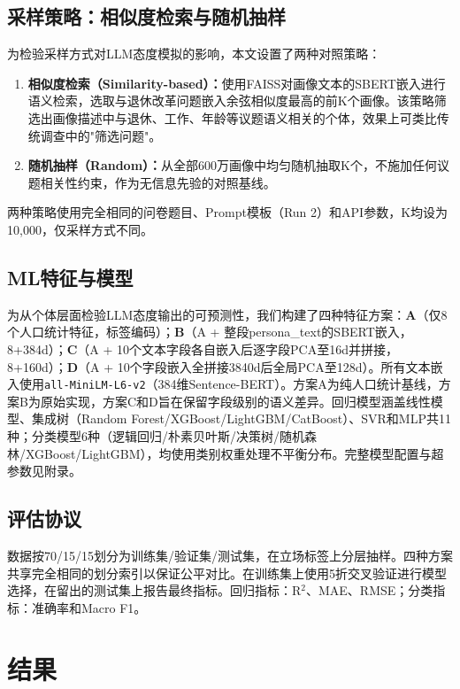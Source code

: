 \documentclass[11pt,a4paper]{ctexart}
\begin{document}
\subsection{采样策略：相似度检索与随机抽样}

为检验采样方式对LLM态度模拟的影响，本文设置了两种对照策略：

\begin{enumerate}[leftmargin=*]
    \item \textbf{相似度检索（Similarity-based）：}使用FAISS对画像文本的SBERT嵌入进行语义检索，选取与退休改革问题嵌入余弦相似度最高的前K个画像。该策略筛选出画像描述中与退休、工作、年龄等议题语义相关的个体，效果上可类比传统调查中的"筛选问题"。
    \item \textbf{随机抽样（Random）：}从全部600万画像中均匀随机抽取K个，不施加任何议题相关性约束，作为无信息先验的对照基线。
\end{enumerate}

两种策略使用完全相同的问卷题目、Prompt模板（Run 2）和API参数，K均设为10,000，仅采样方式不同。

\subsection{ML特征与模型}

为从个体层面检验LLM态度输出的可预测性，我们构建了四种特征方案：\textbf{A}（仅8个人口统计特征，标签编码）；\textbf{B}（A + 整段persona\_text的SBERT嵌入，8+384d）；\textbf{C}（A + 10个文本字段各自嵌入后逐字段PCA至16d并拼接，8+160d）；\textbf{D}（A + 10个字段嵌入全拼接3840d后全局PCA至128d）。所有文本嵌入使用\texttt{all-MiniLM-L6-v2}（384维Sentence-BERT）。方案A为纯人口统计基线，方案B为原始实现，方案C和D旨在保留字段级别的语义差异。回归模型涵盖线性模型、集成树（Random Forest/XGBoost/LightGBM/CatBoost）、SVR和MLP共11种；分类模型6种（逻辑回归/朴素贝叶斯/决策树/随机森林/XGBoost/LightGBM），均使用类别权重处理不平衡分布。完整模型配置与超参数见附录。

\subsection{评估协议}

数据按70/15/15划分为训练集/验证集/测试集，在立场标签上分层抽样。四种方案共享完全相同的划分索引以保证公平对比。在训练集上使用5折交叉验证进行模型选择，在留出的测试集上报告最终指标。回归指标：R$^2$、MAE、RMSE；分类指标：准确率和Macro F1。

\section{结果}
\end{document}
